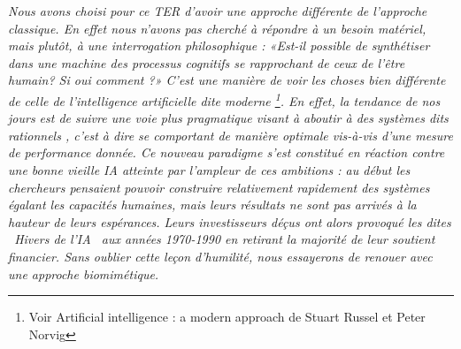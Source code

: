 \emph{Nous avons choisi pour ce TER d'avoir une approche différente de l'approche
classique. En effet nous n'avons pas cherché à répondre à un besoin matériel,
mais plutôt, à une interrogation philosophique : «Est-il possible de
synthétiser dans une machine des processus cognitifs se rapprochant de ceux de
l'être humain? Si oui comment ?» C'est une manière de voir les choses bien
différente de celle de l'intelligence artificielle dite \og moderne \fg
\footnote{Voir \og Artificial intelligence : a modern approach \fg de Stuart
Russel et Peter Norvig}. En effet, la tendance de nos jours est de suivre une
voie plus pragmatique visant à aboutir à des systèmes dits \og rationnels \fg,
c'est à dire se comportant de manière optimale vis-à-vis d'une mesure de performance
donnée.
Ce nouveau paradigme s'est constitué en réaction contre une bonne vieille IA
atteinte par l'ampleur de ces ambitions : au début les chercheurs pensaient
pouvoir construire relativement rapidement des systèmes égalant les capacités
humaines, mais leurs résultats ne sont pas arrivés à la hauteur de leurs
espérances. Leurs investisseurs déçus ont alors provoqué les dites
\og{}~Hivers de l'IA~\fg{} aux années 1970-1990 en retirant la majorité de
leur soutient financier.
Sans oublier cette leçon d'humilité, nous essayerons de renouer avec une
approche biomimétique.}
